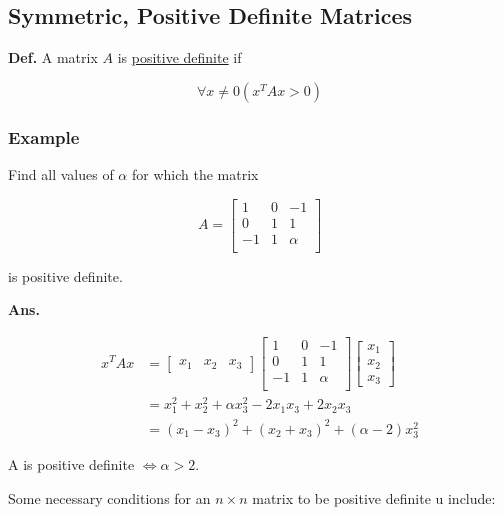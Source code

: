 \subsection{Symmetric, Positive Definite Matrices}

\textbf{Def.} A matrix $A$ is \uline{positive definite} if

\begin{equation*}
  \forall x\ne 0 (x^T A x > 0)
\end{equation*}

\subsubsection*{Example}

Find all values of $\alpha$ for which the matrix

\begin{equation*}
  A = 
  \begin{bmatrix}
    1 & 0 & -1\\
    0 & 1 & 1\\
    -1 & 1 & \alpha\\
  \end{bmatrix}
\end{equation*}

is positive definite.

\textbf{Ans.} 

\begin{align*}
  x^T Ax &= 
  \begin{bmatrix}
  x_1 & x_2 & x_3
  \end{bmatrix}
  \begin{bmatrix}
    1 & 0 & -1\\
    0 & 1 & 1\\
    -1 & 1 & \alpha\\
  \end{bmatrix}
  \begin{bmatrix}
  x_1 \\ x_2 \\ x_3
  \end{bmatrix}\\
         &= x_1^2 + x_2^2 + \alpha x_3^2 - 2x_1x_3 + 2x_2x_3 \\
         &= (x_1 - x_3)^2 + (x_2 + x_3)^2 + (\alpha - 2) x_3^2 
\end{align*}

A is positive definite $\iff \alpha > 2$.

Some necessary conditions for an $n\times n$ matrix to be positive definite u
include:

